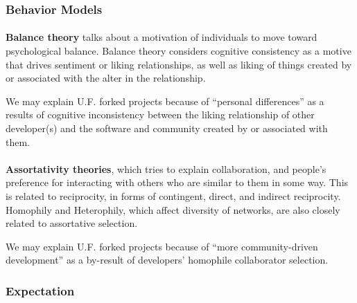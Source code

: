 \documentclass[11pt]{report}
\begin{document}
\subsubsection{Behavior Models}
\paragraph{} \textbf{Balance theory} \cite{Heider} talks about a motivation of individuals to move toward psychological balance. Balance theory considers cognitive consistency as a motive that drives sentiment or liking relationships, as well as liking of things created by or associated with the alter in the relationship.

We may explain U.F. forked projects because of ``personal differences'' as a results of cognitive inconsistency between the liking relationship of other developer(s) and the software and community created by or associated with them. 

\paragraph{} \textbf{Assortativity theories}, which tries to explain collaboration, and people's preference for interacting with others who are similar to them in some way. This is related to reciprocity, in forms of contingent, direct, and indirect reciprocity. Homophily and Heterophily, which affect diversity of networks, are also closely related to assortative selection.

We may explain U.F. forked projects because of ``more community-driven development'' as a by-result of developers' homophile collaborator selection.


\subsubsection{Expectation}
\end{document}
